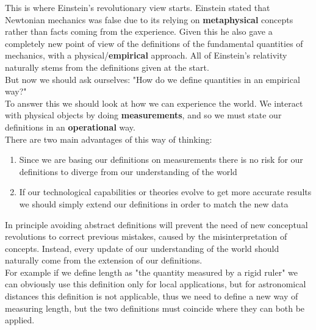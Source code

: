 This is where Einstein's revolutionary view starts. Einstein stated that Newtonian mechanics was false due to its relying on \textbf{metaphysical} concepts rather than facts coming from the experience. Given this he also gave a completely new point of view of the definitions of the fundamental quantities of mechanics, with a physical/\textbf{empirical} approach. All of Einstein's relativity naturally stems from the definitions given at the start.\\
But now we should ask ourselves: "How do we define quantities in an empirical way?"\\
To answer this we should look at how we can experience the world. We interact with physical objects by doing \textbf{measurements}, and so we must state our definitions in an \textbf{operational} way.\\
There are two main advantages of this way of thinking:
\begin{enumerate}
  \item Since we are basing our definitions on measurements there is no risk for our definitions to diverge from our understanding of the world
  \item If our technological capabilities or theories evolve to get more accurate results we should simply extend our definitions in order to match the new data
\end{enumerate}
In principle avoiding abstract definitions will prevent the need of new conceptual revolutions to correct previous mistakes, caused by the misinterpretation of concepts. Instead, every update of our understanding of the world should naturally come from the extension of our definitions.\\
For example if we define length as "the quantity measured by a rigid ruler" we can obviously use this definition only for local applications, but for astronomical distances this definition is not applicable, thus we need to define a new way of measuring length, but the two definitions must coincide where they can both be applied.
